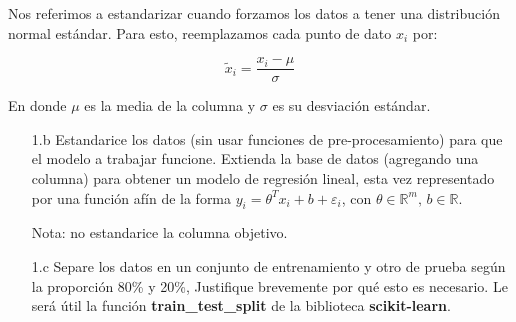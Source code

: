 Nos referimos a estandarizar cuando forzamos los datos a tener una distribución normal estándar. Para esto, reemplazamos cada punto de dato $x_i$ por:

$$ \tilde x_i = \frac{x_i-\mu}{\sigma}$$

En donde $\mu$ es la media de la columna y $\sigma$ es su desviación estándar.

\begin{enumerate}    
    \item[1.b] Estandarice los datos (sin usar funciones de pre-procesamiento) para que el modelo a trabajar funcione. Extienda la base de datos (agregando una columna) para obtener un modelo de regresión lineal, esta vez representado por una función afín de la forma $y_i = \theta^Tx_i + b + \varepsilon_i$, con $\theta\in \mathbb{R}^m,\,b\in \mathbb{R}$.

    Nota: no estandarice la columna objetivo.
    \item[1.c] Separe los datos en un conjunto de entrenamiento y otro de prueba según la proporción 80\% y 20\%,  Justifique brevemente por qué esto es necesario. Le será útil la función \textbf{train\_test\_split} de la biblioteca \textbf{scikit-learn}.
\end{enumerate}

